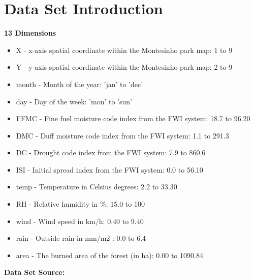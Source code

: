 \documentclass[titlepage,a4paper,12pt,thmsb]{report}
\begin{document}
\chapter*{Data Set Introduction}
{\large \bf {13 Dimensions}}
\begin{itemize}
\item{X - x-axis spatial coordinate within the Montesinho park map: 1 to 9}
\item{Y - y-axis spatial coordinate within the Montesinho park map: 2 to 9}
\item{month - Month of the year: 'jan' to 'dec' }
\item{day - Day of the week: 'mon' to 'sun' }
\item{FFMC - Fine fuel moisture code index from the FWI system: 18.7 to 96.20 }
\item{DMC - Duff moisture code index from the FWI system: 1.1 to 291.3 }
\item{DC - Drought code index from the FWI system: 7.9 to 860.6 }
\item{ISI - Initial spread index from the FWI system: 0.0 to 56.10 }
\item{temp - Temperature in Celsius degrees: 2.2 to 33.30 }
\item{RH - Relative humidity in \%: 15.0 to 100 }
\item{wind - Wind speed in km/h: 0.40 to 9.40 }
\item{rain - Outside rain in mm/m2 : 0.0 to 6.4 }
\item{area - The burned area of the forest (in ha): 0.00 to 1090.84 }
\end{itemize}
{\large \bf {Data Set Source:}}
\newline{}
{ }
\newline{}
\vspace{0.5cm}






\newpage
{}
\newpage
\end{document}
